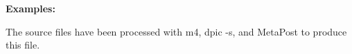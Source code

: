 \documentclass[11pt]{article}
\begin{document}
  \hfill
  {\large\bf Examples:
    
    }
  \hfill\break
  The source files have been processed with m4, dpic -s, and MetaPost to
  produce this file.


\end{document}
